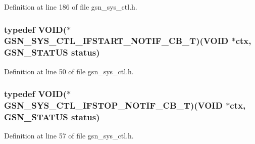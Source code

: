 Definition at line 186 of file gsn\_\-sys\_\-ctl.h.

\hypertarget{a00592_a2378a15a57410fa717b24a73398855f4}{
\subsubsection[{GSN\_\-SYS\_\-CTL\_\-IFSTART\_\-NOTIF\_\-CB\_\-T}]{\setlength{\rightskip}{0pt plus 5cm}typedef VOID($\ast$ {\bf GSN\_\-SYS\_\-CTL\_\-IFSTART\_\-NOTIF\_\-CB\_\-T})(VOID $\ast$ctx, {\bf GSN\_\-STATUS} status)}}
\label{a00592_a2378a15a57410fa717b24a73398855f4}


Definition at line 50 of file gsn\_\-sys\_\-ctl.h.

\hypertarget{a00592_a04addc1c242f2d0a18d2a1f21b8379b1}{
\subsubsection[{GSN\_\-SYS\_\-CTL\_\-IFSTOP\_\-NOTIF\_\-CB\_\-T}]{\setlength{\rightskip}{0pt plus 5cm}typedef VOID($\ast$ {\bf GSN\_\-SYS\_\-CTL\_\-IFSTOP\_\-NOTIF\_\-CB\_\-T})(VOID $\ast$ctx, {\bf GSN\_\-STATUS} status)}}
\label{a00592_a04addc1c242f2d0a18d2a1f21b8379b1}


Definition at line 57 of file gsn\_\-sys\_\-ctl.h.

